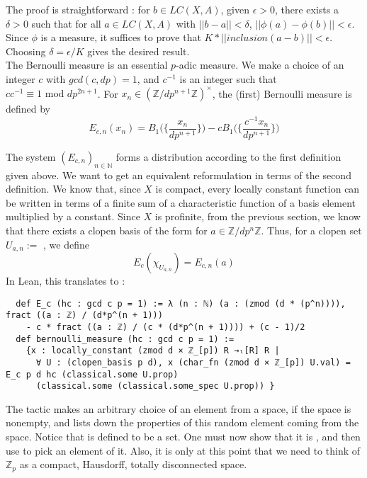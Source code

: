 \documentclass[11pt]{article}
\begin{document}
The proof is straightforward : for $b \in LC(X, A)$, given $\epsilon > 0$, there exists a
$\delta > 0$ such that for all $a \in LC(X, A)$ with $|| b - a || < \delta$,
$|| \phi(a) - \phi(b) || < \epsilon$. Since $\phi$ is a measure, it suffices to prove that
$ K * ||inclusion (a - b)|| < \epsilon $. Choosing $\delta  = \epsilon / K$ gives the desired
result. \\

The Bernoulli measure is an essential $p$-adic measure. We make a choice of an integer $c$ with
$gcd(c,dp) = 1$, and $c^{-1}$ is an integer such that \newline $c c^{-1} \equiv 1 \text{ mod } dp^{2n+1}$.
For $x_n \in (\mathbb{Z} / dp^{n +1} \mathbb{Z})^{\times}$, the (first) Bernoulli measure is defined by
$$ E_{c,n}(x_n) = B_1 \bigg( \bigg\{ \frac{x_n}{dp^{n + 1}} \bigg\} \bigg) -
  cB_1 \bigg( \bigg\{ \frac{c^{-1}x_n}{dp^{n + 1}} \bigg\} \bigg) $$

The system $(E_{c,n})_{n \in \mathbb{N}}$ forms a distribution according to the first definition
given above. We want to get an equivalent reformulation in terms of the second definition.
We know that, since $X$ is compact, every locally constant function can be written in terms of a
finite sum of a characteristic function of a basis element multiplied by a constant. Since $X$ is
profinite, from the previous section, we know that there exists a clopen basis of the form
 for $a \in\mathbb{Z}/dp^{n} \mathbb{Z}$. Thus, for a
clopen set $U_{a,n} := $ , we define
$$ E_c (\chi_{U_{a,n}}) = E_{c,n} (a) $$
In Lean, this translates to :
\begin{lstlisting}
  def E_c (hc : gcd c p = 1) := λ (n : ℕ) (a : (zmod (d * (p^n)))), fract ((a : ℤ) / (d*p^(n + 1)))
    - c * fract ((a : ℤ) / (c * (d*p^(n + 1)))) + (c - 1)/2
  def bernoulli_measure (hc : gcd c p = 1) :=
    {x : locally_constant (zmod d × ℤ_[p]) R →ₗ[R] R |
      ∀ U : (clopen_basis p d), x (char_fn (zmod d × ℤ_[p]) U.val) = E_c p d hc (classical.some U.prop)
      (classical.some (classical.some_spec U.prop)) }
\end{lstlisting}

The tactic  makes an arbitrary choice of an element from a space, if the space
is nonempty, and  lists down the properties of this random element
coming from the space. Notice that  is defined to be a set. One must now show that it is
, and then use  to pick an element of it. Also, it is only at this point that
we need to think of $\mathbb{Z}_p$ as a compact, Hausdorff,
totally disconnected space. \\
\end{document}
